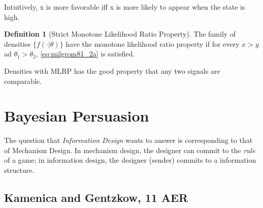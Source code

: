 \documentclass{book}
\theoremstyle{plain}
\theoremstyle{definition}
\newtheorem{defn}{Definition}[section] %
\begin{document}
Intuitively, x is more favorable iff x is more likely to appear when the state is high.

\begin{defn}[Strict Monotone Likelihood Ratio Property]
The family of densities $\{f(\cdot|\theta)\}$ have the monotone likelihood ratio property if for every $x>y$ ad $\theta_1>\theta_2$, \eqref{eq:milgrom81_2a} is satisfied.
\end{defn}

Densities with MLRP has the good property that any two signals are comparable.







\section{Bayesian Persuasion} %
\label{sec:bayesian_persuasion}

The question that \textit{Information Design} wants to answer is corresponding to that of Mechanism Design.
In mechanism design, the designer can commit to the \textit{rule} of a game; in information design, the designer (sender) commits to a information structure.



\subsection{Kamenica and Gentzkow, 11 AER} %
\label{sub:kamenica_and_gentzkow_11}


\textbf{}
\end{document}
